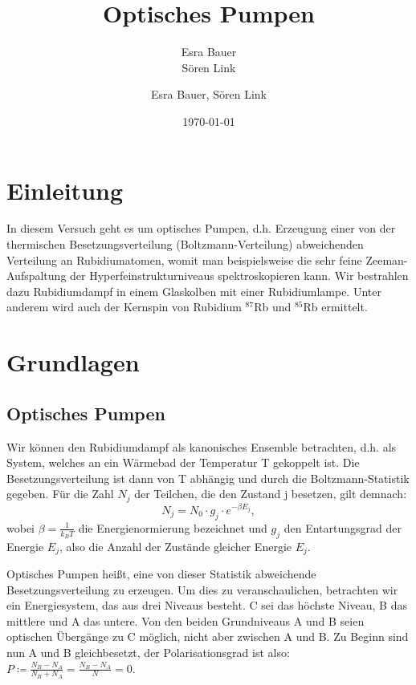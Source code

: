 \documentclass[bigchapter,colorback,accentcolor=tud4b,linedtoc,11pt]{tudreport}
\title{Optisches Pumpen}
\subtitle{Esra Bauer  \\Sören Link}
\author{Esra Bauer, Sören Link}
\date{\today}
\begin{document}

\maketitle

\tableofcontents

\chapter{Einleitung}

In diesem Versuch geht es um optisches Pumpen, d.h. Erzeugung einer von der thermischen Besetzungsverteilung (Boltzmann-Verteilung) abweichenden Verteilung an Rubidiumatomen, womit man beispielsweise die sehr feine Zeeman-Aufspaltung der Hyperfeinstrukturniveaus spektroskopieren kann. Wir bestrahlen dazu Rubidiumdampf in einem Glaskolben mit einer Rubidiumlampe. Unter anderem wird auch der Kernspin von Rubidium $^{87}$Rb und $^{85}$Rb ermittelt.

\chapter{Grundlagen}

\section{Optisches Pumpen}

Wir können den Rubidiumdampf als kanonisches Ensemble betrachten, d.h. als System, welches an ein Wärmebad der Temperatur T gekoppelt ist. Die Besetzungsverteilung ist dann von T abhängig und durch die Boltzmann-Statistik gegeben. Für die Zahl $N_j$ der Teilchen, die den Zustand j besetzen, gilt demnach:
$$N_j = N_0 \cdot g_j \cdot e^{- \beta E_j},$$
wobei $\beta = \frac{1}{k_B T}$ die Energienormierung bezeichnet und $g_j$ den Entartungsgrad der Energie $E_j$, also die Anzahl der Zustände gleicher Energie $E_j$.

Optisches Pumpen heißt, eine von dieser Statistik abweichende Besetzungsverteilung zu erzeugen. Um dies zu veranschaulichen, betrachten wir ein Energiesystem, das aus drei Niveaus besteht. C sei das höchste Niveau, B das mittlere und A das untere. Von den beiden Grundniveaus A und B seien optischen Übergänge zu C möglich, nicht aber zwischen A und B. Zu Beginn sind nun A und B gleichbesetzt, der Polarisationsgrad ist also: $P \coloneqq \frac{N_B-N_A}{N_B+N_A} = \frac{N_B-N_A}{N} = 0$.
\end{document}
